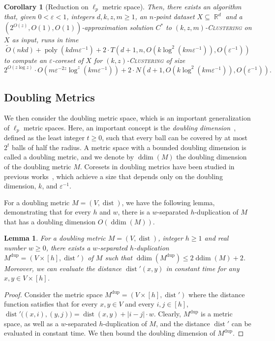 \documentclass[letterpaper,11pt]{article}
\theoremstyle{plain}
\newtheorem{lemma}[theorem]{Lemma}
\newtheorem{corollary}[theorem]{Corollary}
\theoremstyle{definition}
\theoremstyle{remark}
\DeclareMathOperator{\R}{\mathbb{R}}
\DeclareMathOperator{\poly}{poly}
\DeclareMathOperator{\ddim}{ddim}
\DeclareMathOperator{\dist}{dist}
\newcommand{\dup}{\mathrm{dup}}
\newcommand{\eps}{\varepsilon}
\newcommand{\ProblemName}[1]{\textsc{#1}}
\newcommand{\kzC}{\ProblemName{$(k,z)$-Clustering}\xspace}
\newcommand{\kzmC}{\ProblemName{$(k,z,m)$-Clustering}\xspace}
\begin{document}
\begin{appendices}
\begin{corollary}[Reduction on $\ell_p$ metric space]
    Then, there exists an algorithm that, given $0<\eps<1$, integers $d,k,z,m\ge 1$, an $n$-point dataset $X\subseteq \R^d$ and a $(2^{O(z)},O(1),O(1))$-approximation solution $C^*$ to \kzmC on $X$ as input, runs in time
    \begin{equation*}
        \tilde O(nkd) + \poly(kdm\eps^{-1}) + 2\cdot T(d+1,n,O(k\log^2(km\eps^{-1})),O(\eps^{-1}))
    \end{equation*}
    to compute an $\eps$-coreset of $X$ for \kzC of size 
    \begin{equation*}
        2^{O(z\log z)}\cdot O\left(m\eps^{-2z}\log^z(km\eps^{-1})\right) + 2\cdot N\left(d+1,O(k\log^2(km\eps^{-1})), O(\eps^{-1})\right).
    \end{equation*}
\end{corollary}

\subsection{Doubling Metrics}
We then consider the doubling metric space, which is an important generalization of $\ell_p$ metric spaces. Here, an important concept is the \emph{doubling dimension}~\cite{DBLP:conf/focs/GuptaKL03}, defined as the least integer $t\ge 0$, such that every ball can be covered by at most $2^t$ balls of half the radius. A metric space with a bounded doubling dimension is called a doubling metric, and we denote by $\ddim(M)$ the doubling dimension of the doubling metric $M$.
Coresets in doubling metrics have been studied in previous works~\cite{DBLP:conf/focs/HuangJLW18,Cohen-addad2021New}, which achieve a size that depends only on the doubling dimension, $k$, and $\eps^{-1}$.

For a doubling metric $M=(V,\dist)$, we have the following lemma, demonstrating that for every $h$ and $w$, there is a $w$-separated $h$-duplication of $M$ that has a doubling dimension $O(\ddim(M))$.


\begin{lemma}
    \label{lem:duplication doubling}
    For a doubling metric $M=(V,\dist)$, integer $h\ge 1$ and real number $w\ge 0$, there exists a $w$-separated $h$-duplication $M^\dup=(V\times [h],\dist')$ of $M$ such that $\ddim(M^\dup) \le 2\ddim(M) + 2$. Moreover, we can evaluate the distance $\dist'(x,y)$ in constant time for any $x,y\in V\times [h]$.
\end{lemma}
\begin{proof}
    Consider the metric space $M^\dup=(V\times [h],\dist')$ where the distance function satisfies that for every $x,y\in V$ and every $i,j\in [h]$, $\dist'\big((x,i),(y,j) \big) = \dist(x,y) + |i-j|\cdot w$.
    Clearly, $M^\dup$ is a metric space,
    as well as a $w$-separated $h$-duplication of $M$, and the distance $\dist'$ can be evaluated in constant time. We then bound the doubling dimension of $M^\dup$.


\end{proof}
\end{appendices}
\end{document}
